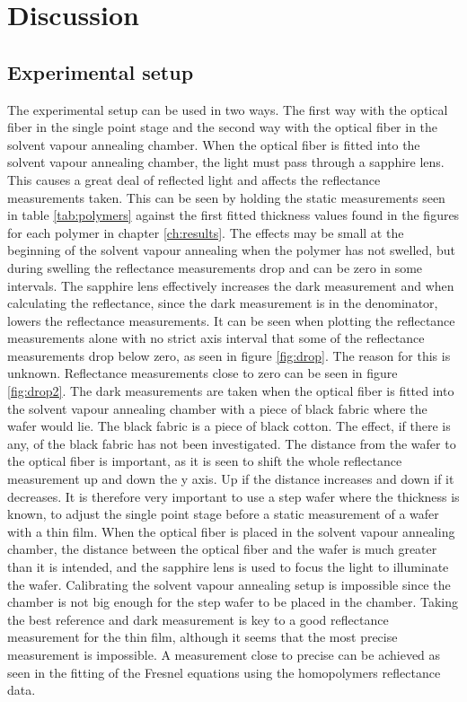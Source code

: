 \documentclass[MasterThesisMain.tex]{subfiles}
\begin{document}
\chapter{Discussion} \label{ch:discussion}

\section{Experimental setup}
The experimental setup can be used in two ways. The first way with the optical fiber in the single point stage and the second way with the optical fiber in the solvent vapour annealing chamber. When the optical fiber is fitted into the solvent vapour annealing chamber, the light must pass through a sapphire lens. This causes a great deal of reflected light and affects the reflectance measurements taken. This can be seen by holding the static measurements seen in table \ref{tab:polymers} against the first fitted thickness values found in the figures for each polymer in chapter \ref{ch:results}. The effects may be small at the beginning of the solvent vapour annealing when the polymer has not swelled, but during swelling the reflectance measurements drop and can be zero in some intervals. The sapphire lens effectively increases the dark measurement and when calculating the reflectance, since the dark measurement is in the denominator, lowers the reflectance measurements. It can be seen when plotting the reflectance measurements alone with no strict axis interval that some of the reflectance measurements drop below zero, as seen in figure \ref{fig:drop}. The reason for this is unknown. Reflectance measurements close to zero can be seen in figure \ref{fig:drop2}. The dark measurements are taken when the optical fiber is fitted into the solvent vapour annealing chamber with a piece of black fabric where the wafer would lie. The black fabric is a piece of black cotton. The effect, if there is any, of the black fabric has not been investigated. The distance from the wafer to the optical fiber is important, as it is seen to shift the whole reflectance measurement up and down the y axis. Up if the distance increases and down if it decreases. It is therefore very important to use a step wafer where the thickness is known, to adjust the single point stage before a static measurement of a wafer with a thin film. When the optical fiber is placed in the solvent vapour annealing chamber, the distance between the optical fiber and the wafer is much greater than it is intended, and the sapphire lens is used to focus the light to illuminate the wafer. Calibrating the solvent vapour annealing setup is impossible since the chamber is not big enough for the step wafer to be placed in the chamber. Taking the best reference and dark measurement is key to a good reflectance measurement for the thin film, although it seems that the most precise measurement is impossible. A measurement close to precise can be achieved as seen in the fitting of the Fresnel equations using the homopolymers reflectance data.
\end{document}
